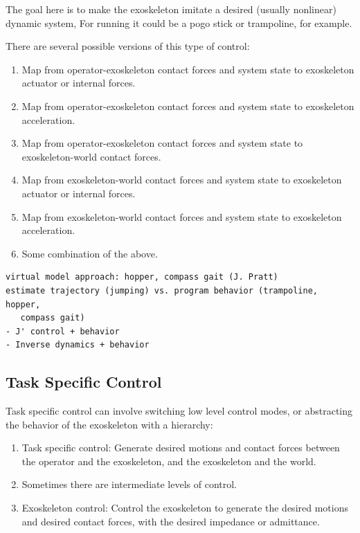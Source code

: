 \documentclass[letterpaper,12pt,fullpage]{article}
\begin{document}
The goal here is to make the exoskeleton imitate a desired (usually nonlinear)
dynamic system,
For running it could be a pogo stick or trampoline, for example.

There are several possible versions of this type of control:
\begin{enumerate}
\item
Map from operator-exoskeleton contact forces and system state
to exoskeleton actuator or internal forces.
\item
Map from operator-exoskeleton contact forces and system state
to exoskeleton acceleration.
\item
Map from operator-exoskeleton contact forces and system state
to exoskeleton-world contact forces.
\item
Map from exoskeleton-world contact forces and system state to exoskeleton actuator or internal forces.
\item
Map from exoskeleton-world contact forces and system state to exoskeleton acceleration.
\item
Some combination of the above.
\end{enumerate}

\begin{verbatim}
virtual model approach: hopper, compass gait (J. Pratt)
estimate trajectory (jumping) vs. program behavior (trampoline, hopper,
   compass gait)
- J' control + behavior
- Inverse dynamics + behavior
\end{verbatim}

\subsection{Task Specific Control}

Task specific control can involve switching low level control modes, or abstracting
the behavior of the exoskeleton with a hierarchy:
\begin{enumerate}
\item
Task specific control: Generate desired motions and contact forces between
the operator and the exoskeleton, and the exoskeleton and the world.
\item
Sometimes there are intermediate levels of control.
\item
Exoskeleton control: Control the exoskeleton to generate the desired motions and
desired contact forces, with the desired impedance or admittance.
\end{enumerate}

\end{document}
